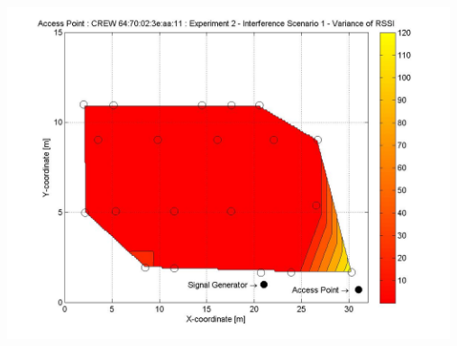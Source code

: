 \documentclass[11pt,a4paper,headinclude,footinclude,chapterprefix=on]{scrreprt}
\begin{document}
\begin{longtable}
	\includegraphics[width=13cm]{../../Source/plot/CREW_11/11_Sig_Ex_2_Variance.jpg} \\
\end{longtable}
\end{document}
